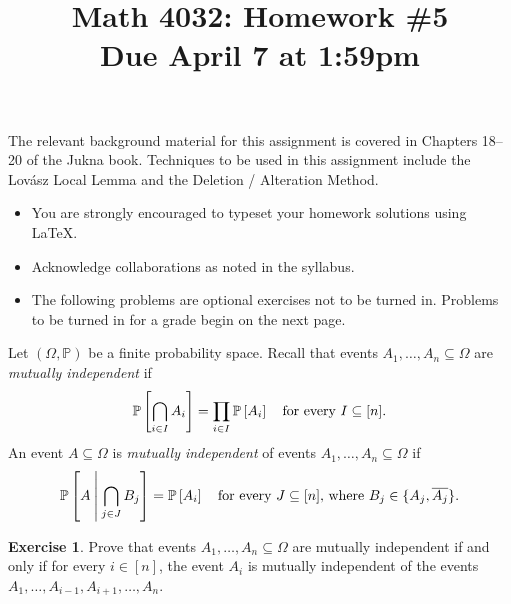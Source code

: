 \documentclass[11pt, letter]{amsart}
\title[Math 4032: Homework \#5\qquad Due April 7 at 1:59pm]{Math 4032: Homework \#5\\
  Due April 7 at 1:59pm}
\theoremstyle{definition}
\newtheorem{exercise}{Exercise}[]
\newcommand{\Prob}[1]{\ensuremath{%
    \mathbb P\left[#1\right]
}}
\newcommand{\ProbCond}[2]{\ensuremath{%
    \mathbb P\left[#1\:\middle|\:#2\right]
  }}
\begin{document}
\maketitle

The relevant background material for this assignment is covered in Chapters 18--20 of the Jukna book.  Techniques to be used in this assignment include the Lov\'asz Local Lemma and the Deletion / Alteration Method.

\begin{itemize}
\item You are strongly encouraged to typeset your homework solutions using \LaTeX.
\item Acknowledge collaborations as noted in the syllabus.
\item The following problems are optional exercises not to be turned in.  Problems to be turned in for a grade begin on the next page.  
\end{itemize}

Let $(\Omega, \mathbb P)$ be a finite probability space.  Recall that events $A_1, \dots, A_n \subseteq \Omega$ are \textit{mutually independent} if
\begin{equation*}
  \Prob{\bigcap_{i\in I}A_i} = \prod_{i\in I}\Prob{A_i} \quad\text{for every $I \subseteq [n]$}.
\end{equation*}
An event $A\subseteq \Omega$ is \textit{mutually independent} of events $A_1, \dots, A_n \subseteq \Omega$ if
\begin{equation*}
  \ProbCond{A}{\bigcap_{j\in J}B_j} = \Prob{A_i} \quad\text{for every $J \subseteq [n]$, where $B_j \in \{A_j, \overline{A_j}\}$}.
\end{equation*}
\begin{exercise}
  Prove that events $A_1, \dots, A_n \subseteq \Omega$ are mutually independent if and only if for every $i \in [n]$, the event $A_i$ is mutually independent of the events $A_1, \dots, A_{i-1}, A_{i+1}, \dots, A_n$.
\end{exercise}
\end{document}
